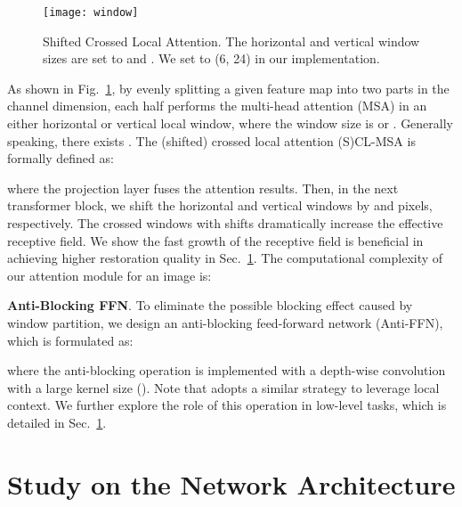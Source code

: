 \documentclass[runningheads]{llncs}
\begin{document}
	\begin{figure}[t]
		\begin{center}
			\texttt{[image: window]}
		\end{center}
\caption{Shifted Crossed Local Attention. The horizontal and vertical window sizes are set to  and . We set  to (6, 24) in our implementation.}
		\vspace{-0.2in}
		\label{fig:att}
	\end{figure}
	
	As shown in Fig.~\ref{fig:att}, by evenly splitting a given feature map  into two parts in the channel dimension, each half performs the multi-head attention (MSA) in an either horizontal or vertical local window, where the window size is  or . Generally speaking, there exists . The (shifted) crossed local attention (S)CL-MSA is formally defined as:
	
	
where the projection layer fuses the attention results. Then, in the next transformer block, we shift the horizontal and vertical windows by  and  pixels, respectively. The crossed windows with shifts dramatically increase the effective receptive field. We show the fast growth of the receptive field is beneficial in achieving higher restoration quality in Sec.~\ref{sec:abl}. The computational complexity of our attention module for an  image is:
	


	
\noindent\textbf{Anti-Blocking FFN}. 
	To eliminate the possible blocking effect caused by window partition, we design an anti-blocking feed-forward network (Anti-FFN), which is formulated as:
	
where the anti-blocking operation is implemented with a depth-wise convolution with a large kernel size (). Note that \cite{wang2021uformer} adopts a similar strategy to leverage local context. We further explore the role of this operation in low-level tasks, which is detailed in Sec.~\ref{sec:abl}.
	\vspace{-0.05in}


	\section{Study on the Network Architecture}
	\label{sec:abl}
	
\end{document}
